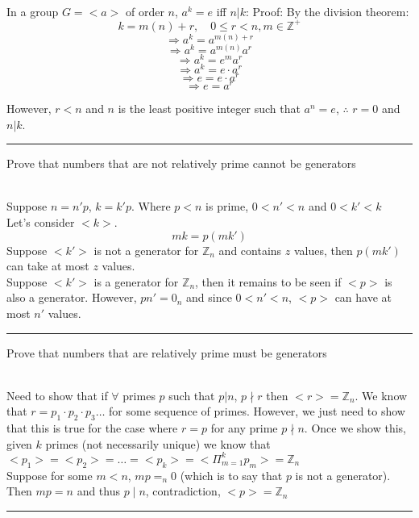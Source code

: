 \documentclass[11pt]{article}
\begin{document}
\begin{solution} \hfill \\
In a group $G=<a>$ of order $n$, $a^k=e$ iff $n|k$:
Proof:
By the division theorem:
$$k = m(n)+r, \quad 0\leq r<n, m\in \mathbb{Z}^+$$
$$\Rightarrow a^k = a^{m(n)+r}$$
$$\Rightarrow a^k = a^{m(n)}a^{r}$$
$$\Rightarrow a^k = e^{m}a^{r}$$
$$\Rightarrow a^k = e\cdot a^{r}$$
$$\Rightarrow e = e\cdot a^{r}$$
$$\Rightarrow e = a^{r}$$

However, $r<n$ and $n$ is the least positive integer such that $a^n=e$, $\therefore$ $r = 0$ and $n|k$.
\end{solution}
\vspace{6pt}
\hrule
\vspace{6pt}

Prove that numbers that are not relatively prime cannot be generators
\begin{solution} \hfill \\
    Suppose $n=n'p$, $k=k'p$. Where $p < n$ is prime, $0< n'<n$ and $0<k'<k$\\
    Let's consider $<k>$.
    $$mk=p(mk')$$
    Suppose $<k'>$ is not a generator for $\mathbb{Z}_n$ and contains $z$ values, then $p(mk')$ can take at most $z$ values.\\
    Suppose $<k'>$ is a generator for $\mathbb{Z}_n$, then it remains to be seen if $<p>$ is also a generator. However, $pn'=0_n$ and since  $0<n'<n$, $<p>$ can have at most $n'$ values.
\end{solution}
\vspace{6pt}
\hrule
\vspace{6pt}
Prove that numbers that are relatively prime must be generators
\begin{solution} \hfill \\
    Need to show that if $\forall$ primes $p$ such that $p|n$, $p\nmid r$ then $<r> = \mathbb{Z}_n$. We know that $r=p_1\cdot p_2\cdot p_3\dots$ for some sequence of primes. However, we just need to show that this is true for the case where $r=p$ for any prime $p\nmid n$. Once we show this, given $k$ primes (not necessarily unique) we know that $<p_1>=<p_2>=\dots =<p_k>=<\Pi_{m=1}^{k} p_m>=\mathbb{Z}_n$\\
    Suppose for some $m<n$, $mp=_n 0$ (which is to say that $p$ is not a generator). Then $mp=n$ and thus $p\mid n$, contradiction, $<p>=\mathbb{Z}_n$
\end{solution}
\vspace{6pt}
\hrule
\vspace{6pt}
\end{document}
